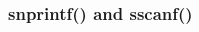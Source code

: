 
\begin{frame}[fragile]
\frametitle{snprintf() and sscanf()}
\begin{columns}

\begin{column}{0.45\textwidth}

\end{column}

\pause
\begin{column}{0.45\textwidth}

\end{column}

\end{columns}
\end{frame}
